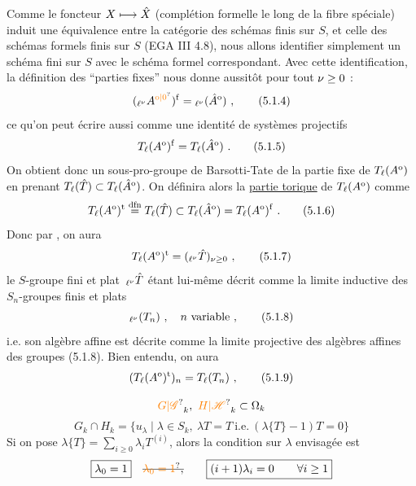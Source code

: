 Comme le foncteur $X\longmapsto\hat X$ (complétion formelle le long de la fibre spéciale) induit une équivalence entre la catégorie des schémas finis sur $S$, et celle des schémas formels finis sur $S$ (EGA III 4.8), nous allons identifier simplement un schéma fini sur $S$ avec le schéma formel correspondant. Avec cette identification, la définition des ``parties fixes'' nous donne aussitôt pour tout $\nu\geq 0$ :
\[
({}_{\handwritten{\ell^{\nu}}}A^{\unsure{\mathrm{o}|0}})^{\mathrm f}={}_{\handwritten{\ell^{\nu}}}(\hat A^{\mathrm o})\ ,\tag*{(5.1.4)}
\]
ce qu'on peut écrire aussi comme une identité de systèmes projectifs
\[
T_{\ell}(A^{\mathrm o})^{\mathrm f}=T_{\ell}(\hat A^{\mathrm o})\ .\tag*{(5.1.5)}
\]
On obtient donc un sous-pro-groupe de Barsotti-Tate de la partie fixe de $T_{\ell}(A^{\mathrm o})$ en prenant $T_{\ell}(\hat T)\subset T_{\ell}(\hat A^{\mathrm o})$. On définira alors la \uline{partie torique} de $T_{\ell}(A^{\mathrm o})$ comme
\[
T_{\handwritten{\ell}}(A^{\mathrm o})^{\mathrm t}\overset{\mathrm{dfn}}{=}T_{\handwritten{\ell}}(\hat T)\handwritten{\subset}T_{\handwritten{\ell}}(\hat A^{\mathrm o})=T_{\handwritten{\ell}}(A^{\mathrm o})^{\mathrm f}\ .\tag*{(5.1.6)}
\]
Donc par , on aura
\[
T_{\handwritten{\ell}}(A^{\mathrm o})^{\mathrm t}=({}_{\handwritten{\ell^{\nu}}}\hat T)_{\handwritten{\nu}\geq 0}\ ,\tag*{(5.1.7)}
\]
le $S$-groupe fini et plat $\,{}_{\ell^{\nu}}\hat T$ étant lui-même décrit comme la limite inductive des $S_n$-groupes finis et plats
\[
{}_{\handwritten{\ell^{\nu}}}(T_n)\ ,\quad n\ \text{variable}\ ,\tag*{(5.1.8)}
\]
i.e. son algèbre affine est décrite comme la limite projective des algèbres affines des groupes (5.1.8). Bien entendu, on aura
\[
(T_{\ell}(A^{\mathrm o})^{\mathrm t})_n=T_{\ell}(T_n)\ ,\tag*{(5.1.9)}
\]

\[
\unsure{G|\mathscr G}_k,\ \unsure{H|\mathscr H}_k\subset\Omega_k
\]
\[
G_k\cap H_k=\{u_\lambda\mid\lambda\in S_k,\ \lambda T=T\ \text{i.e.}\ (\lambda\{T\}-1)T=0\}
\]
Si on pose $\displaystyle\lambda\{T\}=\sum_{i\geq0}\lambda_iT^{(i)}$, alors la condition sur $\lambda$ envisagée est
\[
\boxed{\lambda_0=1}\quad\deleted{\unsure{\lambda_0=1},}\qquad\boxed{(i+1)\lambda_i=0\qquad\forall i\geq1}
\]

